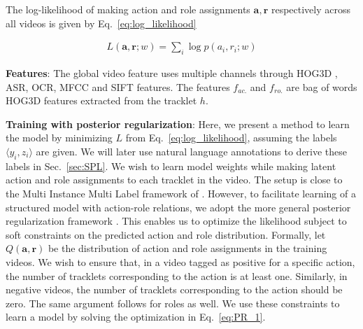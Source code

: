 \documentclass[10pt,twocolumn,letterpaper]{article}
\begin{document}
The log-likelihood of making action and role assignments $\mathbf{a}, \mathbf{r}$ respectively across all videos is
given by Eq.~\ref{eq:log_likelihood}

\begin{eqnarray}\label{eq:log_likelihood}
  L(\mathbf{a}, \mathbf{r}; w) = \sum \limits_{i} \log p(a_i, r_i; w)
\end{eqnarray}

\noindent \textbf{Features}: The global video feature uses multiple channels through
HOG3D \cite{Klaser_BMVC08}, ASR, OCR, MFCC \cite{Rabiner_PH93} and SIFT
\cite{Lowe_IJCV04} features. The features $f_{ac.}$ and $f_{ro.}$
are bag of words HOG3D features extracted from the tracklet $h$.


\noindent \textbf{Training with posterior regularization}: Here, we present a method to
learn the model by minimizing $L$ from Eq.~\ref{eq:log_likelihood}, 
assuming the labels $\langle y_i, z_i \rangle$ are given. 
We will later use natural language annotations to
derive these labels in Sec.~\ref{sec:SPL}. We wish to learn model weights while
making latent action and role assignments to each tracklet in the video. The 
setup is close to the Multi Instance Multi Label framework of \cite{Zhou_NIPS07}. 
However, to facilitate learning of a structured model with action-role
relations, we adopt the more general posterior regularization
framework \cite{Ganchev_JMLR10}.
This enables us to optimize the likelihood subject to soft constraints on
the predicted action and role distribution. Formally, let $Q(\mathbf{a},
\mathbf{r})$ be the distribution of action and role assignments in
the training videos. 
We wish to ensure that, in a video tagged as positive for a specific
action, the number of tracklets corresponding to the action is at least
one. Similarly, in negative videos, the number of tracklets corresponding to
the action should be zero. The same argument follows for roles as
well. We use these constraints to learn a model by solving the
optimization in Eq.~\ref{eq:PR_1}.
\end{document}
